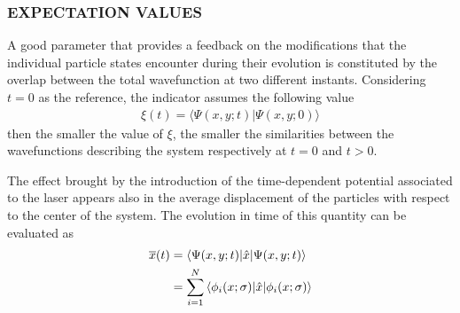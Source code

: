 \subsubsection{EXPECTATION VALUES}
A good parameter that provides a feedback on the modifications that the individual particle states encounter during their evolution is constituted by the overlap between the total wavefunction at two different instants. Considering $t=0$ as the reference, the indicator assumes the following value
\begin{align}
    \xi(t) = \langle \Psi(x,y; t) \vert \Psi(x,y; 0) \rangle 
    \label{eq:overlap_no_coeff}
\end{align}
then the smaller the value of $\xi$, the smaller the similarities between the wavefunctions describing the system respectively at $t=0$ and $t>0$. 

The effect brought by the introduction of the time-dependent potential associated to the laser appears also in the average displacement of the particles with respect to the center of the system. The evolution in time of this quantity can be evaluated as
\begin{align}\begin{split}
    \overline{x}(t) &= \bracketOP{\Psi(x,y; t)}{\Psi(x,y; t)}{\hat{x}} \\
    &= \sum_{i=1}^N \bracketOP{\phi_i(x;\sigma)}{\phi_i(x; \sigma)}{\hat{x}}
\end{split}
\label{eq:x_time_dep_no_coeff}
\end{align}


